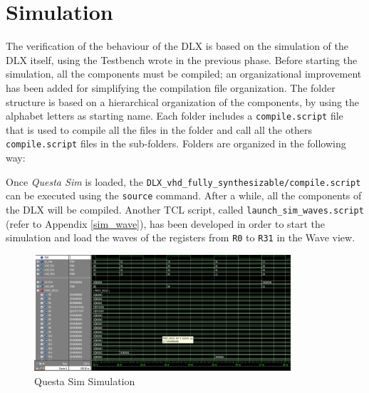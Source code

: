 \section{Simulation}
The verification of the behaviour of the DLX is based on the simulation of the DLX itself, using the Testbench wrote in the previous phase. Before starting the simulation, all the components must be compiled; an organizational improvement has been added for simplifying the compilation file organization. The folder structure is based on a hierarchical organization of the components, by using the alphabet letters as starting name. Each folder includes a \texttt{compile.script} file that is used to compile all the files in the folder and call all the others \texttt{compile.script} files in the sub-folders. Folders are organized in the following way:

\hfill


\hfill


Once \textit{Questa Sim} is loaded, the \texttt{DLX\_vhd\_fully\_synthesizable/compile.script} can be executed using the \texttt{source} command. After a while, all the components of the DLX will be compiled. Another TCL script, called \texttt{launch\_sim\_waves.script} (refer to Appendix \ref{sim_wave}), has been developed in order to start the simulation and load the waves of the registers from \texttt{R0} to \texttt{R31} in the Wave view.

\begin{figure}[H]   
	\centering
	\includegraphics[width=0.85\textwidth]{chapters/8_TestingVerification/images/simulation.png}
	\caption{Questa Sim Simulation}
	\label{fig:simulation}
\end{figure}

